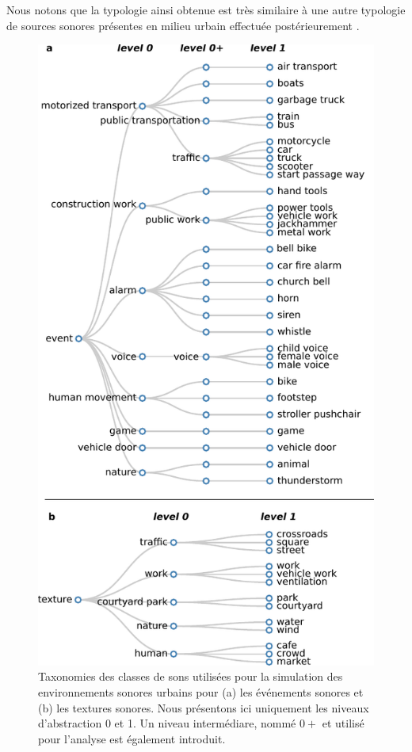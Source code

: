 Nous notons que la typologie ainsi obtenue est très similaire à une autre typologie de sources sonores présentes en milieu urbain effectuée postérieurement \citep{Salamon14}. \\


\begin{figure}[bth]
        \myfloatalign
        \includegraphics[width=.8\linewidth]{gfxHierarchy/taxonomy}
       \caption[Taxonomies des classes de sons utilisées pour la simulation des environnements sonores urbains]{Taxonomies des classes de sons utilisées pour la simulation des environnements sonores urbains pour (a) les événements sonores et (b) les textures sonores. Nous présentons ici uniquement les niveaux d'abstraction 0 et 1. Un niveau intermédiare, nommé $0+$ et utilisé pour l'analyse est également introduit.}\label{fig:taxonomie}
\end{figure}

